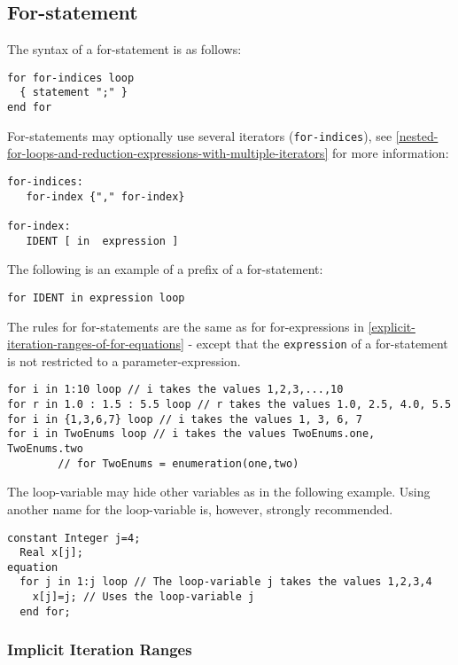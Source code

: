 \subsection{For-statement}

The syntax of a for-statement is as follows:

\begin{lstlisting}[language=grammar]
for for-indices loop
  { statement ";" }
end for
\end{lstlisting}
For-statements may optionally use several iterators (\lstinline!for-indices!), see
\autoref{nested-for-loops-and-reduction-expressions-with-multiple-iterators} for more information:

\begin{lstlisting}[language=grammar]
for-indices:
   for-index {"," for-index}

for-index:
   IDENT [ in  expression ]
\end{lstlisting}
The following is an example of a prefix of a for-statement:

\begin{lstlisting}[language=modelica]
for IDENT in expression loop
\end{lstlisting}
The rules for for-statements are the same as for for-expressions in \autoref{explicit-iteration-ranges-of-for-equations} -
except that the \lstinline!expression! of a for-statement is not restricted to a parameter-expression.

\begin{example}
\begin{lstlisting}[language=modelica]
for i in 1:10 loop // i takes the values 1,2,3,...,10
for r in 1.0 : 1.5 : 5.5 loop // r takes the values 1.0, 2.5, 4.0, 5.5
for i in {1,3,6,7} loop // i takes the values 1, 3, 6, 7
for i in TwoEnums loop // i takes the values TwoEnums.one, TwoEnums.two
        // for TwoEnums = enumeration(one,two)
\end{lstlisting}
The loop-variable may hide other variables as in the following
example. Using another name for the loop-variable is, however, strongly
recommended.
\begin{lstlisting}[language=modelica]
  constant Integer j=4;
  Real x[j];
equation
  for j in 1:j loop // The loop-variable j takes the values 1,2,3,4
    x[j]=j; // Uses the loop-variable j
  end for;
\end{lstlisting}
\end{example}

\subsubsection{Implicit Iteration Ranges}

